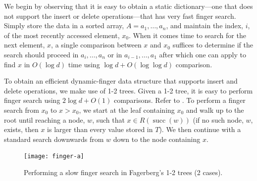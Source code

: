\documentclass{patmorin}
\DeclareMathOperator{\scc}{succ}
\begin{document}
%
%
%
%

We begin by observing that it is easy to obtain a static dictionary---one
that does not support the insert or delete operations---that has
very fast finger search.  Simply store the data in a sorted array,
$A=a_1,\ldots,a_n$, and maintain the index, $i$, of the most recently
accessed element, $x_0$.  When it comes time to search for the next
element, $x$, a single comparison between $x$ and $x_0$ suffices
to determine if the search should proceed in $a_i,\ldots, a_n$ or in
$a_{i-1},\ldots,a_1$ after which one can apply 
to find $x$ in $O(\log d)$ time using $\log d + O(\log\log d)$ comparison.

To obtain an efficient dynamic-finger data structure that supports insert
and delete operations, we make use of 1-2 trees.  Given a 1-2 tree, it
is easy to perform finger search using $2\log d + O(1)$ comparisons.
Refer to . To perform a finger search from $x_0$ to
$x>x_0$, we start at the leaf containing $x_0$ and walk up to the root
until reaching a node, $w$, such that $x\in R(\scc(w))$ (if no such
node, $w$, exists, then $x$ is larger than every value stored in $T$).
We then continue with a standard search downwards from $w$ down to the
node containing $x$.

\begin{figure}
  \begin{center}
    \texttt{[image: finger-a]}
  \end{center}
  \caption{Performing a slow finger search in Fagerberg's 1-2 trees (2 cases).}
\end{figure}
\end{document}
